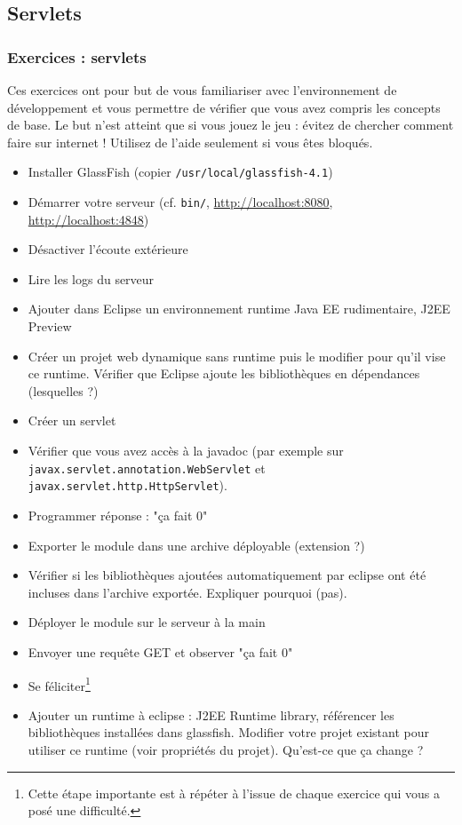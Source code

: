 \documentclass[english, french]{beamer}
\begin{document}
\subsection{Servlets}
\begin{frame}[allowframebreaks]
	\small
	\frametitle{Exercices : servlets}
	Ces exercices ont pour but de vous familiariser avec l’environnement de développement et vous permettre de vérifier que vous avez compris les concepts de base. Le but n’est atteint que si vous jouez le jeu : évitez de chercher comment faire sur internet ! Utilisez de l’aide seulement si vous êtes bloqués.
	\begin{itemize}
		\item \og{}Installer\fg{} GlassFish (copier \texttt{/usr/local/glassfish-4.1})
		\item Démarrer votre serveur (cf. \texttt{bin/}, \url{http://localhost:8080}, \url{http://localhost:4848})
		\item Désactiver l’écoute extérieure
		\item Lire les logs du serveur
		\item Ajouter dans Eclipse un environnement runtime Java EE rudimentaire, \og{}J2EE Preview\fg{}
		\item Créer un projet web dynamique sans runtime puis le modifier pour qu’il vise ce runtime. Vérifier que Eclipse ajoute les bibliothèques en dépendances (lesquelles ?)
		\item Créer un servlet
		\item Vérifier que vous avez accès à la javadoc (par exemple sur \texttt{javax.servlet.annotation.WebServlet} et \texttt{javax.servlet.http.HttpServlet}).
		\item Programmer réponse : "ça fait 0"
		\item Exporter le module dans une archive déployable (extension ?)
		\item Vérifier si les bibliothèques ajoutées automatiquement par eclipse ont été incluses dans l’archive exportée. Expliquer pourquoi (pas).
		\item Déployer le module sur le serveur à la main
		\item Envoyer une requête GET et observer "ça fait 0"
		\item Se féliciter\footnote{Cette étape importante est à répéter à l’issue de chaque exercice qui vous a posé une difficulté.}
		\item Ajouter un runtime à eclipse : J2EE Runtime library, référencer les bibliothèques installées dans glassfish. Modifier votre projet existant pour utiliser ce runtime (voir propriétés du projet). Qu’est-ce que ça change ?

\end{itemize}
\end{frame}
\end{document}
